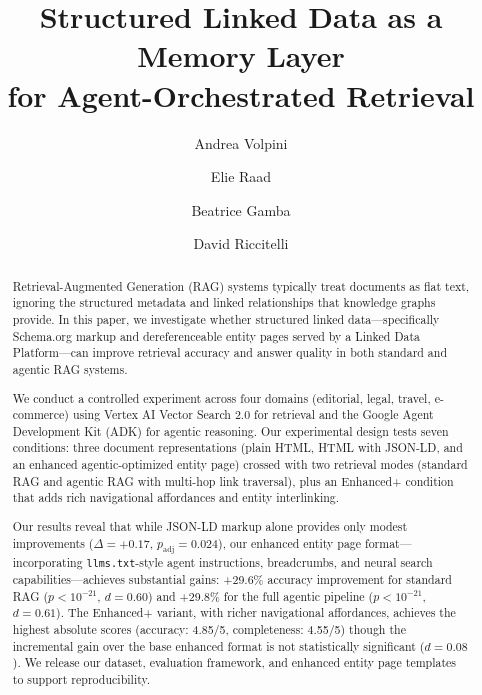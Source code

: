 \documentclass[runningheads]{llncs}
\begin{document}
\title{Structured Linked Data as a Memory Layer\\
for Agent-Orchestrated Retrieval}


\author{Andrea Volpini \and Elie Raad \and Beatrice Gamba \and David Riccitelli}



\maketitle

\begin{abstract}
Retrieval-Augmented Generation (RAG) systems typically treat documents as
flat text, ignoring the structured metadata and linked relationships that
knowledge graphs provide. In this paper, we investigate whether structured
linked data---specifically Schema.org markup and dereferenceable entity
pages served by a Linked Data Platform---can improve retrieval accuracy
and answer quality in both standard and agentic RAG systems.

We conduct a controlled experiment across four domains (editorial, legal,
travel, e-commerce) using Vertex AI Vector Search 2.0 for retrieval and
the Google Agent Development Kit (ADK) for agentic reasoning. Our
experimental design tests seven conditions: three document representations
(plain HTML, HTML with JSON-LD, and an enhanced agentic-optimized entity
page) crossed with two retrieval modes (standard RAG and agentic RAG
with multi-hop link traversal), plus an Enhanced+ condition that adds
rich navigational affordances and entity interlinking.

Our results reveal that while JSON-LD markup alone provides only modest
improvements ($\Delta = +0.17$, $p_{\text{adj}} = 0.024$), our enhanced entity page
format---incorporating \texttt{llms.txt}-style agent instructions,
breadcrumbs, and neural search capabilities---achieves substantial
gains: +29.6\% accuracy improvement for standard RAG ($p < 10^{-21}$,
$d = 0.60$) and +29.8\% for the full agentic pipeline ($p < 10^{-21}$,
$d = 0.61$). The Enhanced+ variant, with richer navigational
affordances, achieves the highest absolute scores (accuracy: 4.85/5,
completeness: 4.55/5) though the incremental gain over the base
enhanced format is not statistically significant ($d = 0.08$).
We release our dataset, evaluation framework,
and enhanced entity page templates to support reproducibility.

\end{abstract}
\end{document}
